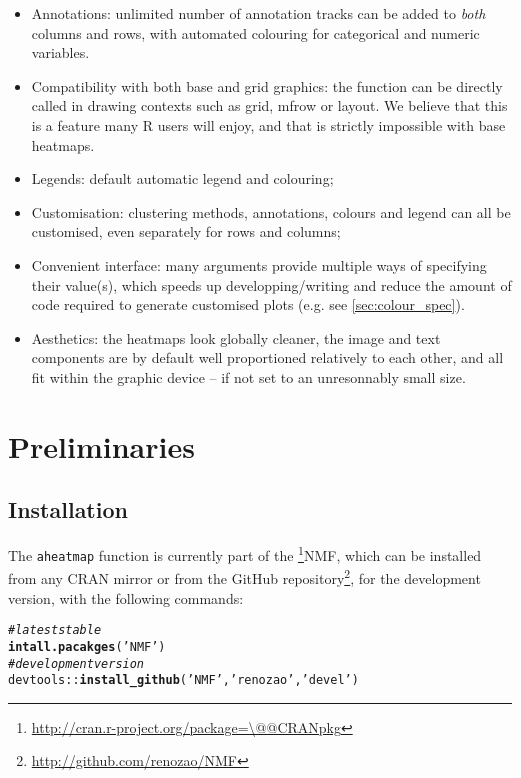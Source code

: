 \documentclass[a4paper]{article}\usepackage[]{graphicx}\usepackage[]{color}
\makeatletter
\newcommand{\hlstr}[1]{\textcolor[rgb]{0.192,0.494,0.8}{#1}}%
\newcommand{\hlcom}[1]{\textcolor[rgb]{0.678,0.584,0.686}{\textit{#1}}}%
\newcommand{\hlopt}[1]{\textcolor[rgb]{0,0,0}{#1}}%
\newcommand{\hlstd}[1]{\textcolor[rgb]{0.345,0.345,0.345}{#1}}%
\newcommand{\hlkwd}[1]{\textcolor[rgb]{0.737,0.353,0.396}{\textbf{#1}}}%
\newenvironment{kframe}{%
 \def\at@end@of@kframe{}%
 \ifinner\ifhmode%
  \def\at@end@of@kframe{\end{minipage}}%
  \begin{minipage}{\columnwidth}%
 \fi\fi%
 \def\FrameCommand##1{\hskip\@totalleftmargin \hskip-\fboxsep
 \colorbox{shadecolor}{##1}\hskip-\fboxsep
     \hskip-\linewidth \hskip-\@totalleftmargin \hskip\columnwidth}%
 \MakeFramed {\advance\hsize-\width
   \@totalleftmargin\z@ \linewidth\hsize
   \@setminipage}}%
 {\par\unskip\endMakeFramed%
 \at@end@of@kframe}
\newenvironment{knitrout}{}{} %
\let\code=\texttt
\newcommand{\pkgname}[1]{\textit{#1}\xspace}
\newcommand{\CRANurl}[1]{\url{http://cran.r-project.org/package=#1}}
\def\CRANpkg{\@ifstar\@CRANpkg\@@CRANpkg}
\def\@CRANpkg#1{\href{http://cran.r-project.org/package=#1}{\pkgname{#1}}\footnote{\CRANurl{#1}}}
\def\@@CRANpkg#1{\href{http://cran.r-project.org/package=#1}{\pkgname{#1}} package\footnote{\CRANurl{#1}}}
\newcommand{\footurl}[1]{\footnote{\url{#1}}}
\makeatother
\begin{document}
\begin{itemize}
\item Annotations: unlimited number of annotation tracks can be added to 
\emph{both} columns and rows, with automated colouring for categorical and 
numeric variables.
\item Compatibility with both base and grid graphics: the function can be 
directly called in drawing contexts such as grid, mfrow or layout.
We believe that this is a feature many R users will enjoy, and that is
strictly impossible with base heatmaps.
\item Legends: default automatic legend and colouring;
\item Customisation: clustering methods, annotations, colours and legend can all 
be customised, even separately for rows and columns;
\item Convenient interface: many arguments provide multiple ways of 
specifying their value(s), which speeds up developping/writing and reduce the 
amount of code required to generate customised plots (e.g. see
\cref{sec:colour_spec}).
\item Aesthetics: the heatmaps look globally cleaner, the image and text components 
are by default well proportioned relatively to each other, and all fit within 
the graphic device -- if not set to an unresonnably small size.
\end{itemize}

\section{Preliminaries}

\subsection{Installation}

The \code{aheatmap} function is currently part of the \CRANpkg{NMF}, which can
be installed from any CRAN mirror or from the GitHub
repository\footurl{http://github.com/renozao/NMF}, for the development version,
with the following commands:

\begin{knitrout}\small
{}\color{fgcolor}\begin{kframe}
\begin{alltt}
\hlcom{# latest stable}
\hlkwd{intall.pacakges}\hlstd{(}\hlstr{'NMF'}\hlstd{)}
\hlcom{# development version}
\hlstd{devtools}\hlopt{::}\hlkwd{install_github}\hlstd{(}\hlstr{'NMF'}\hlstd{,} \hlstr{'renozao'}\hlstd{,} \hlstr{'devel'}\hlstd{)}
\end{alltt}
\end{kframe}
\end{knitrout}
\end{document}

